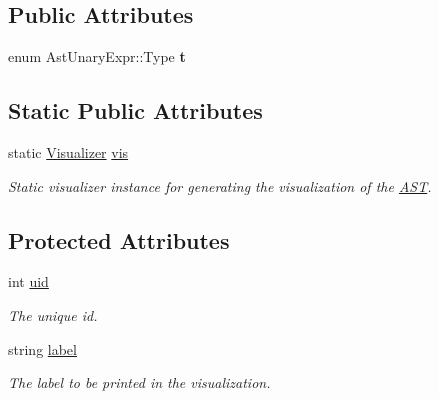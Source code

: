 \subsection*{Public Attributes}
\begin{DoxyCompactItemize}
\item 
\hypertarget{classAstUnaryExpr_aa3cec070038e9d68b11137b18aeb478f}{enum Ast\-Unary\-Expr\-::\-Type {\bfseries t}}\label{classAstUnaryExpr_aa3cec070038e9d68b11137b18aeb478f}

\end{DoxyCompactItemize}
\subsection*{Static Public Attributes}
\begin{DoxyCompactItemize}
\item 
\hypertarget{classAST_aca9e6637209b31e03a09c0d42f29bdfa}{static \hyperlink{classVisualizer}{Visualizer} \hyperlink{classAST_aca9e6637209b31e03a09c0d42f29bdfa}{vis}}\label{classAST_aca9e6637209b31e03a09c0d42f29bdfa}

\begin{DoxyCompactList}\small\item\em Static visualizer instance for generating the visualization of the \hyperlink{classAST}{A\-S\-T}. \end{DoxyCompactList}\end{DoxyCompactItemize}
\subsection*{Protected Attributes}
\begin{DoxyCompactItemize}
\item 
\hypertarget{classAST_a847b778f1c3dd5a19de32de432ee6e15}{int \hyperlink{classAST_a847b778f1c3dd5a19de32de432ee6e15}{uid}}\label{classAST_a847b778f1c3dd5a19de32de432ee6e15}

\begin{DoxyCompactList}\small\item\em The unique id. \end{DoxyCompactList}\item 
\hypertarget{classAST_ab2e239ccc0688d2341724432ff5a1a31}{string \hyperlink{classAST_ab2e239ccc0688d2341724432ff5a1a31}{label}}\label{classAST_ab2e239ccc0688d2341724432ff5a1a31}

\begin{DoxyCompactList}\small\item\em The label to be printed in the visualization. \end{DoxyCompactList}\end{DoxyCompactItemize}
